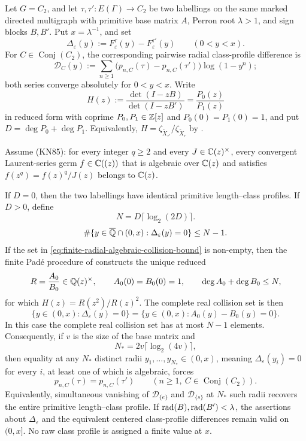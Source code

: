 \begin{theorem}
\label{thm:finite-radial-sampling}
Let \(G=C_2\), and let
\(\tau,\tau':E(\Gamma)\to C_2\) be two labellings on the same marked
directed multigraph with primitive base matrix \(A\), Perron root
\(\lambda>1\), and sign blocks \(B,B'\).  Put \(x=\lambda^{-1}\), and set
\[
 \Delta_\varepsilon(y)
 :=F_\varepsilon^\tau(y)-F_\varepsilon^{\tau'}(y)
 \qquad(0<y<x).
\]
For
\(C\in\operatorname{Conj}(C_2)\), the corresponding pairwise radial
class-profile difference is
\[
 \mathcal D_C(y):=\sum_{n\ge1}
 \bigl(p_{n,C}(\tau)-p_{n,C}(\tau')\bigr)\log(1-y^n);
\]
both series converge absolutely for \(0<y<x\).  Write
\[
 H(z):=\frac{\det(I-zB)}{\det(I-zB')}
      =\frac{P_0(z)}{P_1(z)}
\]
in reduced form with coprime \(P_0,P_1\in\mathbb{Z}[z]\) and
\(P_0(0)=P_1(0)=1\), and put \(D=\deg P_0+\deg P_1\).
Equivalently, \(H=\zeta_{\widetilde X_{\tau'}}/
\zeta_{\widetilde X_\tau}\) by .

Assume \textup{(KN85)}: for every integer \(q\ge2\) and every
\(J\in\mathbb{C}(z)^\times\), every convergent Laurent-series germ
\(f\in\mathbb{C}((z))\) that is algebraic over \(\mathbb{C}(z)\) and satisfies
\(f(z^q)=f(z)^q/J(z)\) belongs to \(\mathbb{C}(z)\).

If \(D=0\), then the two labellings have identical primitive
length--class profiles.  If \(D>0\), define
\[
 N=D\lceil\log_2(2D)\rceil.
\]
\begin{equation}\label{eq:finite-radial-algebraic-collision-bound}
 \#\{y\in\overline{\mathbb{Q}}\cap(0,x):
          \Delta_\varepsilon(y)=0\}\le N-1.
\end{equation}
If the set in
\eqref{eq:finite-radial-algebraic-collision-bound} is non-empty, then the
finite Pad\'e procedure of
 constructs the unique reduced
\[
 R=\frac{A_0}{B_0}\in\mathbb{Q}(z)^\times,
 \qquad A_0(0)=B_0(0)=1,
 \qquad \deg A_0+\deg B_0\le N,
\]
for which \(H(z)=R(z^2)/R(z)^2\).  The complete real collision set is then
\begin{equation}\label{eq:finite-radial-complete-collision-set}
 \{y\in(0,x):\Delta_\varepsilon(y)=0\}
 =\{y\in(0,x):A_0(y)-B_0(y)=0\}.
\end{equation}
In this case the complete real collision set has at most \(N-1\) elements.
Consequently, if \(v\) is the size of the base matrix and
\[
 N_*=2v\lceil\log_2(4v)\rceil,
\]
then equality at any \(N_*\) distinct radii
\(y_1,\ldots,y_{N_*}\in(0,x)\), meaning
\(\Delta_\varepsilon(y_i)=0\) for every \(i\), at least one of which is
algebraic, forces
\[
 p_{n,C}(\tau)=p_{n,C}(\tau')
 \qquad(n\ge1,\ C\in\operatorname{Conj}(C_2)).
\]
Equivalently, simultaneous vanishing of
\(\mathcal D_{\{e\}}\) and \(\mathcal D_{\{s\}}\) at \(N_*\) such radii
recovers the entire primitive length--class profile.
If \(\operatorname{rad}(B),\operatorname{rad}(B')<\lambda\), the assertions about
\(\Delta_\varepsilon\) and the equivalent centered class-profile differences
remain valid on \((0,x]\).  No raw class profile is assigned a finite value at
\(x\).
\end{theorem}

